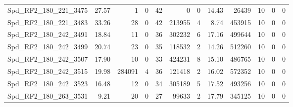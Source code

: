 \begin{longtable}[c]{@{}lrrrrrrrrrrr@{}}
Spd\_RF2\_180\_221\_3475      & 27.57                  & 1                       & 0                       & 42                     & 0                       & 0                       & 14.43                   & 26439                    & 10                       & 0                        & 0                        \\
Spd\_RF2\_180\_221\_3483      & 33.26                  & 28                      & 0                       & 42                     & 213955                  & 4                       & 8.74                    & 453915                   & 10                       & 0                        & 0                        \\
Spd\_RF2\_180\_242\_3491      & 18.84                  & 11                      & 0                       & 36                     & 302232                  & 6                       & 17.16                   & 499644                   & 10                       & 0                        & 0                        \\
Spd\_RF2\_180\_242\_3499      & 20.74                  & 23                      & 0                       & 35                     & 118532                  & 2                       & 14.26                   & 512260                   & 10                       & 0                        & 0                        \\
Spd\_RF2\_180\_242\_3507      & 17.90                  & 10                      & 0                       & 33                     & 424231                  & 8                       & 15.10                   & 486765                   & 10                       & 0                        & 0                        \\
Spd\_RF2\_180\_242\_3515      & 19.98                  & 284091                  & 4                       & 36                     & 121418                  & 2                       & 16.02                   & 572352                   & 10                       & 0                        & 0                        \\
Spd\_RF2\_180\_242\_3523      & 16.48                  & 12                      & 0                       & 34                     & 305189                  & 5                       & 17.52                   & 493256                   & 10                       & 0                        & 0                        \\
Spd\_RF2\_180\_263\_3531      & 9.21                   & 20                      & 0                       & 27                     & 99633                   & 2                       & 17.79                   & 345125                   & 10                       & 0                        & 0                        \\

\end{longtable}
